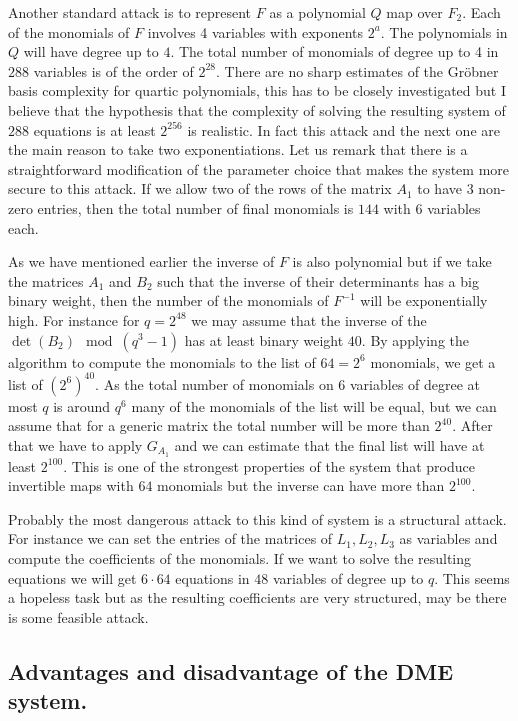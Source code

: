 \documentclass[12pt,a4paper]{amsart}
\theoremstyle{remark}
\theoremstyle{definition}
\begin{document}
Another standard attack is to represent $F$ as a polynomial $Q$ map over $F_2$. 
Each of the monomials of $F$ involves 4 variables with exponents $2^a$. The polynomials in $Q$ will have degree up to $4$. 
The total number of monomials of degree up to 4 in $288$ variables  is of the order of $2^{28}$. 
There are no sharp estimates of the Gr\"obner basis complexity for quartic polynomials, this has to be closely investigated but 
I believe that the hypothesis that the complexity of solving the resulting system of $288$ equations is at least $2^{256}$ is realistic. 
In fact this attack and the next one are the main reason to take two exponentiations. 
Let us remark that there is a straightforward modification of the parameter choice that makes the system more secure to this attack. 
If we allow two of the rows of the matrix $A_1$ to have $3$ non-zero entries, then the total number of final monomials is $144$ 
with $6$ variables each.

As we have mentioned earlier the inverse of $F$ is also polynomial but if we take the matrices $A_1$ and $B_2$ such that the inverse 
of their determinants has a big binary weight, then the number of the monomials of $F^{-1}$ will be exponentially high. 
For instance for $q=2^{48}$ we may assume that the inverse of the $\det(B_2) \mod (q^3-1)$ has at least binary weight $40$. 
By applying the algorithm to compute the monomials to the list of $64=2^6$ monomials, we get a list of $(2^6)^{40}$. 
As the total number of monomials on $6$ variables of degree at most $q$ is around $q^6$ many of the monomials of the list will be equal, 
but we can assume that for a generic matrix the total number will be more than $2^{40}$. 
After that we have to apply $G_{A_{1}}$ and we can estimate that the final  list will have at least $2^{100}$. 
This is one of the strongest properties of the system that produce invertible maps with $64$ monomials but the 
inverse can have more than $2^{100}.$

Probably the most dangerous attack to this kind of system is a structural attack. 
For instance we can set the entries of the matrices of $L_1,L_2,L_3$ as variables and compute the coefficients of the monomials. 
If we want to solve the resulting equations we will get $6\cdot 64$ equations in $48$ variables of degree up to $q$. 
This seems a hopeless task but as the resulting coefficients are very structured, may be there is some feasible attack.

\subsection*{Advantages and disadvantage of the DME system.}
\end{document}

